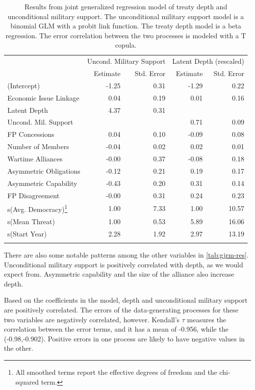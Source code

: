 \documentclass[12pt]{article}
\begin{document}
\begin{table}[!htbp] 
\centering
\begin{tabular}{lrrrr}
  \hline
  & \multicolumn{2}{c}{Uncond. Military Support} & \multicolumn{2}{c}{Latent Depth (rescaled)}  \\ 
  & Estimate & Std. Error & Estimate & Std. Error \\ 
  \hline
   (Intercept) & -1.25 & 0.31 & -1.29 & 0.22 \\ 
   Economic Issue Linkage & 0.04 & 0.19 & 0.01 & 0.16 \\ 
   Latent Depth & 4.37 & 0.31 &  &  \\ 
   Uncond. Mil. Support &  &  & 0.71 & 0.09 \\ 
   FP Concessions & 0.04 & 0.10 & -0.09 & 0.08 \\ 
   Number of Members & -0.04 & 0.02 & 0.02 & 0.01 \\ 
   Wartime Alliances & -0.00 & 0.37 & -0.08 & 0.18 \\ 
   Asymmetric Obligations & -0.12 & 0.21 & 0.19 & 0.17 \\ 
   Asymmetric Capability & -0.43 & 0.20 & 0.31 & 0.14 \\ 
   FP Disagreement & -0.00 & 0.31 & 0.24 & 0.23 \\ 
   s(Avg. Democracy)\footnote{All smoothed terms report the effective degrees of freedom and the chi-squared term.} & 1.00 & 7.33 & 1.00 & 10.57 \\ 
   s(Mean Threat) & 1.00 & 0.53 & 5.89 & 16.06 \\ 
   s(Start Year) & 2.28 & 1.92 & 2.97 & 13.19 \\ 
\hline \\
\end{tabular} 
  \caption{Results from joint generalized regression model of treaty depth and unconditional military support. The unconditional military support model is a binomial GLM with a probit link function. The treaty depth model is a beta regression. The error correlation between the two processes is modeled with a T copula.} 
  \label{tab:gjrm-res} 
\end{table} 


There are also some notable patterns among the other variables in \autoref{tab:gjrm-res}. 
Unconditional military support is positively correlated with depth, as we would expect from. 
Asymmetric capability and the size of the alliance also increase depth. 


Based on the coefficients in the model, depth and unconditional military support are positively correlated. 
The errors of the data-generating processes for these two variables are negatively correlated, however. 
Kendall's $\tau$ measures the correlation between the error terms, and it has a mean of -0.956, while the (-0.98,-0.902).
Positive errors in one process are likely to have negative values in the other. 
\end{document}
